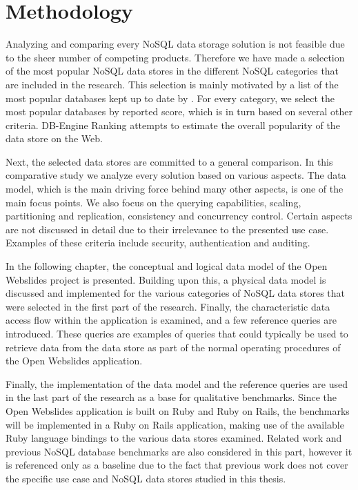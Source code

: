 
\chapter{Methodology}
\label{ch:methodology}

Analyzing and comparing every NoSQL data storage solution is not feasible due to the sheer number of competing products.
Therefore we have made a selection of the most popular NoSQL data stores in the different NoSQL categories that are included in the research.
This selection is mainly motivated by a list of the most popular databases kept up to date by \textcite{DBEngine2018}.
For every category, we select the most popular databases by reported score, which is in turn based on several other criteria.
DB-Engine Ranking attempts to estimate the overall popularity of the data store on the Web.

Next, the selected data stores are committed to a general comparison.
In this comparative study we analyze every solution based on various aspects.
The data model, which is the main driving force behind many other aspects, is one of the main focus points.
We also focus on the querying capabilities, scaling, partitioning and replication, consistency and concurrency control.
Certain aspects are not discussed in detail due to their irrelevance to the presented use case.
Examples of these criteria include security, authentication and auditing.

In the following chapter, the conceptual and logical data model of the Open Webslides project is presented.
Building upon this, a physical data model is discussed and implemented for the various categories of NoSQL data stores that were selected in the first part of the research.
Finally, the characteristic data access flow within the application is examined, and a few reference queries are introduced.
These queries are examples of queries that could typically be used to retrieve data from the data store as part of the normal operating procedures of the Open Webslides application.

Finally, the implementation of the data model and the reference queries are used in the last part of the research as a base for qualitative benchmarks.
Since the Open Webslides application is built on Ruby and Ruby on Rails, the benchmarks will be implemented in a Ruby on Rails application, making use of the available Ruby language bindings to the various data stores examined.
Related work and previous NoSQL database benchmarks are also considered in this part, however it is referenced only as a baseline due to the fact that previous work does not cover the specific use case and NoSQL data stores studied in this thesis.
